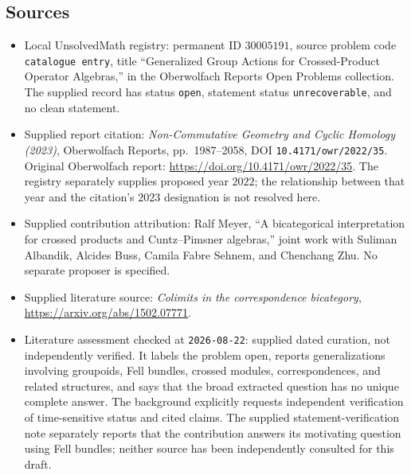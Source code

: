 \documentclass[11pt]{article}
\begin{document}
\subsection{Sources}
\begin{itemize}
\item Local UnsolvedMath registry: permanent ID \(30005191\), source problem code \texttt{catalogue entry}, title ``Generalized Group Actions for Crossed-Product Operator Algebras,'' in the Oberwolfach Reports Open Problems collection. The supplied record has status \texttt{open}, statement status \texttt{unrecoverable}, and no clean statement.
\item Supplied report citation: \emph{Non-Commutative Geometry and Cyclic Homology (2023)}, Oberwolfach Reports, pp.\ 1987--2058, DOI \texttt{10.4171/owr/2022/35}. Original Oberwolfach report: \url{https://doi.org/10.4171/owr/2022/35}. The registry separately supplies proposed year \(2022\); the relationship between that year and the citation's \(2023\) designation is not resolved here.
\item Supplied contribution attribution: Ralf Meyer, ``A bicategorical interpretation for crossed products and Cuntz--Pimsner algebras,'' joint work with Suliman Albandik, Alcides Buss, Camila Fabre Sehnem, and Chenchang Zhu. No separate proposer is specified.
\item Supplied literature source: \emph{Colimits in the correspondence bicategory}, \url{https://arxiv.org/abs/1502.07771}.
\item Literature assessment checked at \texttt{2026-08-22}: supplied dated curation, not independently verified. It labels the problem open, reports generalizations involving groupoids, Fell bundles, crossed modules, correspondences, and related structures, and says that the broad extracted question has no unique complete answer. The background explicitly requests independent verification of time-sensitive status and cited claims. The supplied statement-verification note separately reports that the contribution answers its motivating question using Fell bundles; neither source has been independently consulted for this draft.
\end{itemize}
\end{document}
